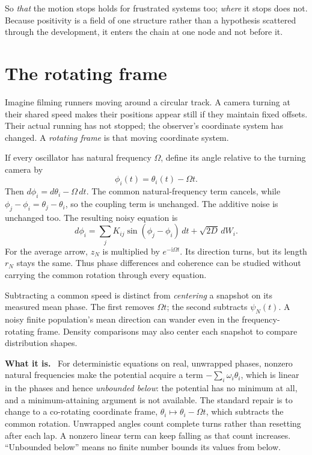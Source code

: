 \documentclass[11pt]{article}
\newcommand{\what}{\par\smallskip\noindent\textbf{What it is.}\ }
\begin{document}
\noindent
So \emph{that} the motion stops holds for frustrated systems too;
\emph{where} it stops does not. Because positivity is a field of one structure
rather than a hypothesis scattered through the development, it enters the chain
at one node and not before it.

\section{The rotating frame}
\label{sec:rotating}

Imagine filming runners moving around a circular track. A camera turning at
their shared speed makes their positions appear still if they maintain fixed
offsets. Their actual running has not stopped; the observer's coordinate system
has changed. A \emph{rotating frame} is that moving coordinate system.

If every oscillator has natural frequency $\Omega$, define its angle relative
to the turning camera by
\[
 \phi_i(t)=\theta_i(t)-\Omega t.
\]
Then $d\phi_i=d\theta_i-\Omega\,dt$. The common natural-frequency term
cancels, while $\phi_j-\phi_i=\theta_j-\theta_i$, so the coupling term is
unchanged. The additive noise is unchanged too. The resulting noisy equation is
\[
 d\phi_i=\sum_jK_{ij}\sin(\phi_j-\phi_i)\,dt+\sqrt{2D}\,dW_i.
\]
For the average arrow, $z_N$ is multiplied by $e^{-\mathrm{i}\Omega t}$.
Its direction turns, but its length $r_N$ stays the same. Thus phase differences
and coherence can be studied without carrying the common rotation through
every equation.

Subtracting a common speed is distinct from \emph{centering} a snapshot on
its measured mean phase. The first removes $\Omega t$; the second subtracts
$\psi_N(t)$. A noisy finite population's mean direction can wander even in
the frequency-rotating frame. Density comparisons may also center each
snapshot to compare distribution shapes.

\what
For deterministic equations on real, unwrapped phases, nonzero natural
frequencies make the potential acquire a term
$-\sum_i\omega_i\theta_i$, which is linear in the phases and hence
\emph{unbounded below}: the potential has no minimum at all, and a
minimum-attaining argument is not available. The standard repair is to change
to a co-rotating coordinate frame, $\theta_i\mapsto\theta_i-\Omega t$, which
subtracts the common rotation. Unwrapped angles count complete turns rather
than resetting after each lap. A nonzero linear term can keep falling as that
count increases. ``Unbounded below'' means no finite number bounds its values
from below.
\end{document}
